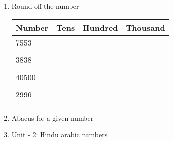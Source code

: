 \begin{enumerate}
    \item Round off the number

    \begin{myTableStyle} \begin{tabular}{ |m{2cm}|m{2.5cm}|m{2.5cm}|m{2.5cm}| } \hline
        Number  & Tens & Hundred & Thousand  \\\hline
        7553 & & & \\& & &  \\ \hline
        3838 & & &\\& & &  \\ \hline
        40500& & &\\& & &  \\ \hline
        2996 & & &\\& & &  \\ \hline
    \end{tabular} \end{myTableStyle} \vspace{0.08in}

    \item Abacus for a given number

    \item Unit - 2: Hindu arabic numbers

\end{enumerate}


